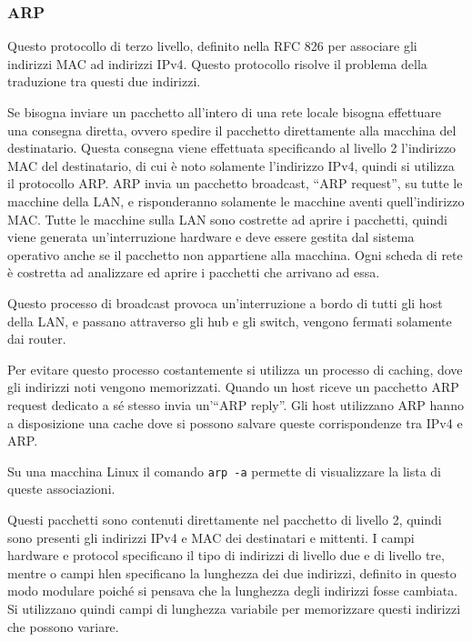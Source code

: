 \documentclass{article}
\numberwithin{equation}{subsection}
\begin{document}
\subsubsection{ARP}

Questo protocollo di terzo livello, definito nella RFC 826 per associare gli indirizzi MAC ad indirizzi IPv4. Questo protocollo risolve il problema della traduzione 
tra questi due indirizzi. 

Se bisogna inviare un pacchetto all'intero di una rete locale bisogna effettuare una consegna diretta, ovvero spedire il pacchetto direttamente alla macchina del 
destinatario. Questa consegna viene effettuata specificando al livello 2 l'indirizzo MAC del destinatario, di cui è noto solamente l'indirizzo IPv4, quindi 
si utilizza il protocollo ARP. 
ARP invia un pacchetto broadcast, ``ARP request'', su tutte le macchine della LAN, e risponderanno solamente le macchine aventi quell'indirizzo MAC. Tutte le macchine sulla LAN 
sono costrette ad aprire i pacchetti, quindi viene generata un'interruzione hardware e deve essere gestita dal sistema operativo anche se il pacchetto non 
appartiene alla macchina. Ogni scheda di rete è costretta ad analizzare ed aprire i pacchetti che arrivano ad essa. 

Questo processo di broadcast provoca un'interruzione a bordo di tutti gli host della LAN, e passano attraverso gli hub e gli switch, vengono fermati solamente 
dai router. 

Per evitare questo processo costantemente si utilizza un processo di caching, dove gli indirizzi noti vengono memorizzati. Quando un host riceve un pacchetto 
ARP request dedicato a sé stesso invia un'``ARP reply''. 
Gli host utilizzano ARP hanno a disposizione una cache dove si possono salvare queste corrispondenze tra IPv4 e ARP. 

Su una macchina Linux il comando \verb|arp -a| permette di visualizzare la lista di queste associazioni. 

Questi pacchetti sono contenuti direttamente nel pacchetto di livello 2, quindi sono presenti gli indirizzi IPv4 e MAC dei destinatari e mittenti. 
I campi hardware e protocol specificano il tipo di indirizzi di livello due e di livello tre, mentre o campi hlen specificano la lunghezza dei due indirizzi, 
definito in questo modo modulare poiché si pensava che la lunghezza degli indirizzi fosse cambiata. Si utilizzano quindi 
campi di lunghezza variabile per memorizzare questi indirizzi che possono variare. 


\end{document}

